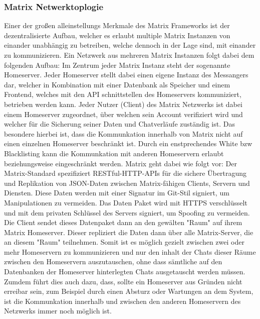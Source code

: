 \subsubsection{Matrix Netwerktoplogie}\label{chapter:aemn}
Einer der großen alleinstellungs Merkmale des Matrix Frameworks ist der dezentralisierte Aufbau, welcher es erlaubt multiple Matrix Instanzen von einander unabhängig zu betreiben, welche dennoch in der Lage sind, mit einander zu kommunizieren. Ein Netzwerk aus mehreren Matrix Instanzen folgt dabei dem folgenden Aufbau:
Im Zentrum jeder Matrix Instanz steht der sogenannte Homeserver. Jeder Homeserver stellt dabei einen eigene Instanz des Messangers dar, welcher in Kombination mit einer Datenbank als Speicher und einem Frontend, welches mit den API schnittstellen des Homeservers kommuniziert, betrieben werden kann. Jeder Nutzer (Client) des Matrix Netzwerks ist dabei einem Homeserver zugeordnet, über welchen sein Account verifiziert wird und welcher für die Sicherung seiner Daten und Chatverläufe zuständig ist. Das besondere hierbei ist, dass die Kommunkation innerhalb von Matrix nicht auf einen einzelnen Homeserver beschränkt ist. Durch ein enstprechendes White bzw Blacklisting kann die Kommunkation mit anderen Homeservern erlaubt beziehungsweise eingeschränkt werden. Matrix geht dabei wie folgt vor:
Der Matrix-Standard spezifiziert RESTful-HTTP-APIs für die sichere Übertragung und Replikation von JSON-Daten zwischen Matrix-fähigen Clients, Servern und Diensten. Diese Daten werden mit einer Signatur im Git-Stil signiert, um Manipulationen zu vermeiden. Das Daten Paket wird mit HTTPS verschlüsselt und mit dem privaten Schlüssel des Servers signiert, um Spoofing zu vermeiden.
Die Client sendet dieses Datenpaket dann an den gewälten "Raum" auf ihrem Matrix Homeserver. Dieser repliziert die Daten dann über alle Matrix-Server, die an diesem "Raum" teilnehmen. Somit ist es möglich gezielt zwischen zwei oder mehr Homeservern zu kommunizieren und nur den inhalt der Chats dieser Räume zwischen den Homeservern auszutauschen, ohne dass sämtliche auf den Datenbanken der Homeserver hinterlegten Chats ausgetauscht werden müssen. Zumdem führt dies auch dazu, dass, sollte ein Homeserver aus Gründen nicht erreibar sein, zum Beispiel durch einen Absturz oder Wartungen an dem System, ist die Kommunkation innerhalb und zwischen den anderen Homeservern des Netzwerks immer noch möglich ist.

